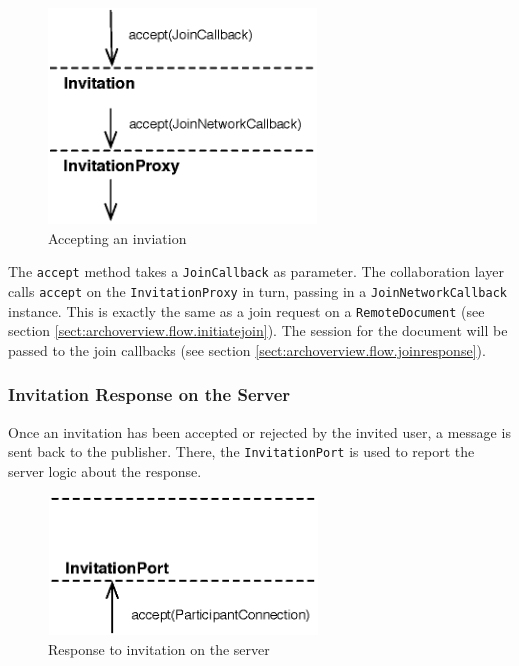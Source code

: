 \begin{figure}[H]
 \centering
 \includegraphics[width=7.13cm,height=5.72cm]{../images/finalreport/architecture_flows/invite_accept.eps}
 \caption{Accepting an inviation}
 \label{fig:archoverview.flow.inviteaccept}
\end{figure}

The \texttt{accept} method takes a \texttt{Join\-Callback} as parameter. The
collaboration layer calls \texttt{accept} on the \texttt{Invitation\-Proxy}
in turn, passing in a \texttt{Join\-Network\-Callback} instance. This is
exactly the same as a join request on a \texttt{Remote\-Document} (see
section \ref{sect:archoverview.flow.initiatejoin}). The session for the
document will be passed to the join callbacks (see section 
\ref{sect:archoverview.flow.joinresponse}).

\subsubsection{Invitation Response on the Server}
Once an invitation has been accepted or rejected by the invited user, a
message is sent back to the publisher. There, the \texttt{Invitation\-Port}
is used to report the server logic about the response.

\begin{figure}[H]
 \centering
 \includegraphics[width=7.16cm,height=3.70cm]{../images/finalreport/architecture_flows/invite_response.eps}
 \caption{Response to invitation on the server}
 \label{fig:archoverview.flow.inviteresponse}
\end{figure}

